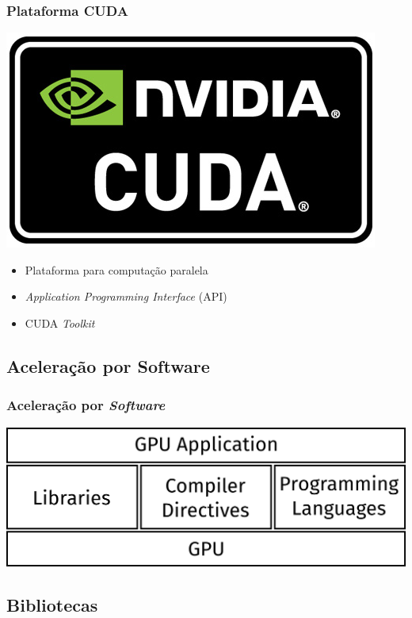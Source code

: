 \documentclass[10pt, compress]{beamer}
\begin{document}
\begin{frame}
    \frametitle{Plataforma CUDA}
    \begin{center}
        \includegraphics[width=.4\textwidth]{cuda-logo}
    \end{center}
    \pause

    \begin{itemize}
        \item Plataforma para \alert{computação paralela}
        \item \textit{Application Programming Interface} (API)
        \item CUDA \textit{Toolkit}
    \end{itemize}
\end{frame}

\subsection{Aceleração por Software}

\begin{frame}
    \frametitle{Aceleração por \textit{Software}}
    \centering
    \includegraphics[width=.95\textwidth]{accel_apps}
\end{frame}

\subsection{Bibliotecas}
\end{document}
